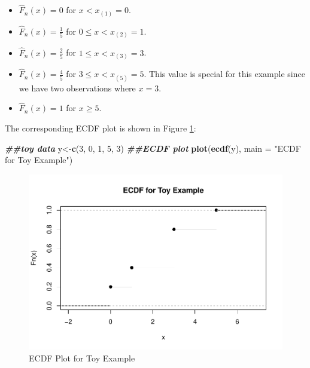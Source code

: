 \documentclass[
]{book}
\newenvironment{Shaded}{\begin{snugshade}}{\end{snugshade}}
\newcommand{\AttributeTok}[1]{\textcolor[rgb]{0.13,0.29,0.53}{#1}}
\newcommand{\DecValTok}[1]{\textcolor[rgb]{0.00,0.00,0.81}{#1}}
\newcommand{\DocumentationTok}[1]{\textcolor[rgb]{0.56,0.35,0.01}{\textbf{\textit{#1}}}}
\newcommand{\FunctionTok}[1]{\textcolor[rgb]{0.13,0.29,0.53}{\textbf{#1}}}
\newcommand{\NormalTok}[1]{#1}
\newcommand{\OtherTok}[1]{\textcolor[rgb]{0.56,0.35,0.01}{#1}}
\newcommand{\StringTok}[1]{\textcolor[rgb]{0.31,0.60,0.02}{#1}}
\providecommand{\tightlist}{%
  \setlength{\itemsep}{0pt}\setlength{\parskip}{0pt}}
\begin{document}
\begin{itemize}
\tightlist
\item
  \(\hat{F}_n(x) = 0\) for \(x < x_{(1)} = 0\).
\item
  \(\hat{F}_n(x) = \frac{1}{5}\) for \(0 \leq x < x_{(2)} = 1\).
\item
  \(\hat{F}_n(x) = \frac{2}{5}\) for \(1 \leq x < x_{(3)} = 3\).
\item
  \(\hat{F}_n(x) = \frac{4}{5}\) for \(3 \leq x < x_{(5)} = 5\). This value is special for this example since we have two observations where \(x=3\).
\item
  \(\hat{F}_n(x) = 1\) for \(x \geq 5\).
\end{itemize}

The corresponding ECDF plot is shown in Figure \ref{fig:ecdf}:

\begin{Shaded}
\begin{Highlighting}[]
\DocumentationTok{\#\#toy data}
\NormalTok{y}\OtherTok{\textless{}{-}}\FunctionTok{c}\NormalTok{(}\DecValTok{3}\NormalTok{, }\DecValTok{0}\NormalTok{, }\DecValTok{1}\NormalTok{, }\DecValTok{5}\NormalTok{, }\DecValTok{3}\NormalTok{)}
\DocumentationTok{\#\#ECDF plot}
\FunctionTok{plot}\NormalTok{(}\FunctionTok{ecdf}\NormalTok{(y), }\AttributeTok{main =} \StringTok{"ECDF for Toy Example"}\NormalTok{)}
\end{Highlighting}
\end{Shaded}

\begin{figure}
\centering
\includegraphics{bookdown-demo_files/figure-latex/ecdf-1.pdf}
\caption{\label{fig:ecdf}ECDF Plot for Toy Example}
\end{figure}
\end{document}
